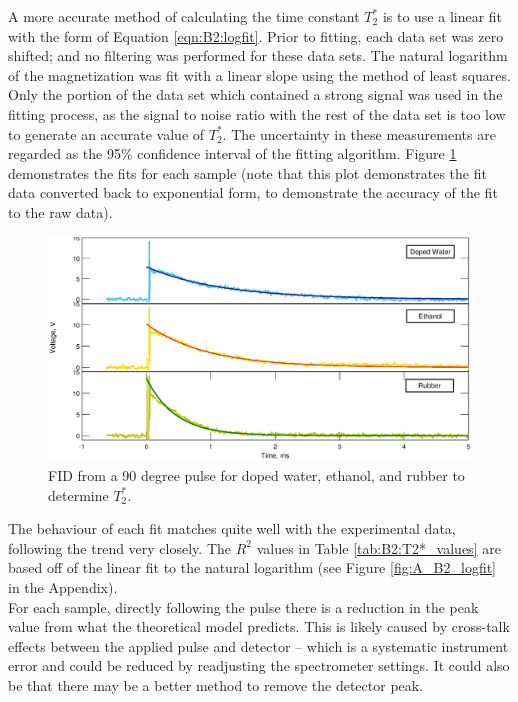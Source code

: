 A more accurate method of calculating the time constant $T_2^*$ is to use a linear fit with the form of Equation \ref{eqn:B2:logfit}. Prior to fitting, each data set was zero shifted; and no filtering was performed for these data sets. The natural logarithm of the magnetization was fit with a linear slope using the method of least squares. Only the portion of the data set which contained a strong signal was used in the fitting process, as the signal to noise ratio with the rest of the data set is too low to generate an accurate value of $T_2^*$. The uncertainty in these measurements are regarded as the 95\% confidence interval of the fitting algorithm. Figure \ref{fig:B2:T2*_samples} demonstrates the fits for each sample (note that this plot demonstrates the fit data converted back to exponential form, to demonstrate the accuracy of the fit to the raw data).\\

\begin{figure}[H]
\centering
\includegraphics[width=\textwidth]{figures/B2/B2_1.eps}
\caption{FID from a 90 degree pulse for doped water, ethanol, and rubber to determine $T_2^*$.}
\label{fig:B2:T2*_samples}
\end{figure}

The behaviour of each fit matches quite well with the experimental data, following the trend very closely. The $R^2$ values in Table \ref{tab:B2:T2*_values} are based off of the linear fit to the natural logarithm (see Figure \ref{fig:A_B2_logfit} in the Appendix).\\

For each sample, directly following the pulse there is a reduction in the peak value from what the theoretical model predicts. This is likely caused by cross-talk effects between the applied pulse and detector -- which is a systematic instrument error and could be reduced by readjusting the spectrometer settings. It could also be that there may be a better method to remove the detector peak.

